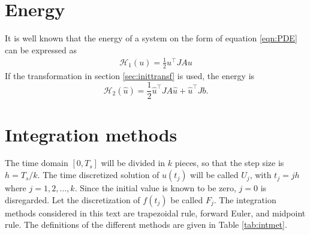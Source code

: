 \section{Energy}%
It is well known that the energy of a system on the form of equation \eqref{eqn:PDE} can be expressed as \cite{energy}
\begin{equation*}
\begin{aligned}
\mathcal{H}_1(u) = \frac{1}{2} u^\top J A u
\end{aligned}
\end{equation*}
\noindent If the transformation in section \ref{sec:inittransf} is used, the energy is 
\begin{equation}
\mathcal{H}_2 (\hat{u}) = \frac{1}{2} \hat{u}^\top   J A \hat{u} + \hat{u}^\top  J b.
\label{eqn:energy2}
\end{equation}


\section{Integration methods}%
\noindent The time domain $[0,T_s]$ will be divided in $k$ pieces, so that the step size is $h = T_s/k$. The time discretized solution of $u(t_j)$ will be called $U_j$, with $t_j = j h$ where $ j = 1,2,\dots,k $. Since the initial value is known to be zero, $j = 0$ is disregarded. Let the discretization of $f(t_j)$ be called $F_j$. The integration methods considered in this text are trapezoidal rule, forward Euler, and midpoint rule. The definitions of the different methods are given in Table \ref{tab:intmet}. \\

